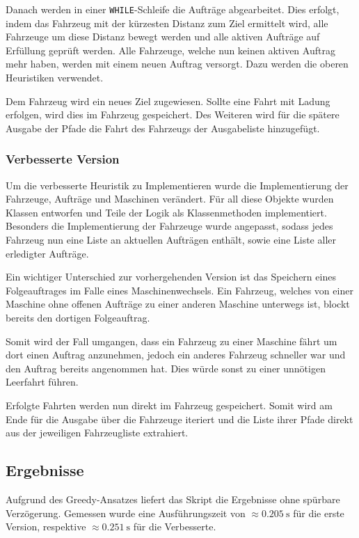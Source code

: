 \documentclass[ngerman]{tudscrreprt}
\newcommand{\code}[1]{\texttt{#1}}
\begin{document}
Danach werden in einer \code{WHILE}-Schleife die Aufträge abgearbeitet. Dies erfolgt,
indem das Fahrzeug mit der kürzesten Distanz zum Ziel ermittelt wird, alle Fahrzeuge
um diese Distanz bewegt werden und alle aktiven Aufträge auf Erfüllung geprüft werden.
Alle Fahrzeuge, welche nun keinen aktiven Auftrag mehr haben, werden mit einem neuen
Auftrag versorgt. Dazu werden die oberen Heuristiken verwendet.

Dem Fahrzeug wird ein neues Ziel zugewiesen. Sollte eine Fahrt mit Ladung erfolgen, wird
dies im Fahrzeug gespeichert. Des Weiteren wird für die spätere Ausgabe der Pfade die
Fahrt des Fahrzeugs der Ausgabeliste hinzugefügt.

\subsubsection{Verbesserte Version}
Um die verbesserte Heuristik zu Implementieren wurde die Implementierung der Fahrzeuge,
Aufträge und Maschinen verändert. Für all diese Objekte wurden Klassen entworfen und
Teile der Logik als Klassenmethoden implementiert. Besonders die Implementierung der
Fahrzeuge wurde angepasst, sodass jedes Fahrzeug nun eine Liste an aktuellen Aufträgen
enthält, sowie eine Liste aller erledigter Aufträge.

Ein wichtiger Unterschied zur vorhergehenden Version ist das Speichern eines
Folgeauftrages im Falle eines Maschinenwechsels. Ein Fahrzeug, welches von einer
Maschine ohne offenen Aufträge zu einer anderen Maschine unterwegs ist, blockt bereits
den dortigen Folgeauftrag.

Somit wird der Fall umgangen, dass ein Fahrzeug zu einer Maschine fährt um dort einen
Auftrag anzunehmen, jedoch ein anderes Fahrzeug schneller war und den Auftrag bereits
angenommen hat. Dies würde sonst zu einer unnötigen Leerfahrt führen.

Erfolgte Fahrten werden nun direkt im Fahrzeug gespeichert. Somit wird am Ende für die
Ausgabe über die Fahrzeuge iteriert und die Liste ihrer Pfade direkt aus der jeweiligen
Fahrzeugliste extrahiert.


\subsection{Ergebnisse}
Aufgrund des Greedy-Ansatzes liefert das Skript die Ergebnisse ohne spürbare Verzögerung.
Gemessen wurde eine Ausführungszeit von $\approx \SI{0.205}{\second}$
für die erste Version, respektive $\approx \SI{0.251}{\second}$ für die Verbesserte.
\end{document}
